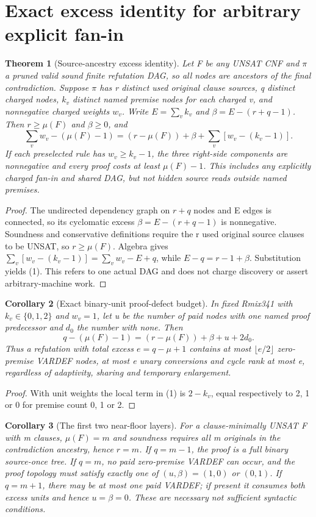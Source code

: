 \documentclass[11pt]{article}
\newtheorem{theorem}{Theorem}
\newtheorem{corollary}[theorem]{Corollary}
\begin{document}
\section*{Exact excess identity for arbitrary explicit fan-in}
\begin{theorem}[Source-ancestry excess identity]\label{thm:weighted}
Let F be any UNSAT CNF and $\pi$ a \emph{pruned} valid sound finite refutation DAG, so all nodes are ancestors of the final contradiction. Suppose $\pi$ has r distinct used original clause sources, q distinct charged nodes, $k_v$ distinct named premise nodes for each charged v, and nonnegative charged weights $w_v$. Write $E=\sum_vk_v$ and $\beta=E-(r+q-1)$. Then $r\ge\mu(F)$ and $\beta\ge0$, and
\[
\boxed{\sum_vw_v-(\mu(F)-1)
=(r-\mu(F))+\beta+\sum_v[w_v-(k_v-1)].}
\tag{1}
\]
If each preselected rule has $w_v\ge k_v-1$, the three right-side components are nonnegative and every proof costs at least $\mu(F)-1$. This includes any explicitly charged fan-in and shared DAG, but not hidden source reads outside named premises.
\end{theorem}
\begin{proof}
The undirected dependency graph on $r+q$ nodes and E edges is connected, so its cyclomatic excess $\beta=E-(r+q-1)$ is nonnegative. Soundness and conservative definitions require the r used original source clauses to be UNSAT, so $r\ge\mu(F)$. Algebra gives
$\sum_v[w_v-(k_v-1)]=\sum_vw_v-E+q$, while
$E-q=r-1+\beta$. Substitution yields (1). This refers to one actual DAG and does not charge discovery or assert arbitrary-machine work.
\end{proof}

\begin{corollary}[Exact binary-unit proof-defect budget]\label{cor:binary}
In fixed Rmix341 with $k_v\in\{0,1,2\}$ and $w_v=1$, let u be the number of paid nodes with one named proof predecessor and $d_0$ the number with none. Then
\[
\boxed{q-(\mu(F)-1)=(r-\mu(F))+\beta+u+2d_0.}
\tag{2}
\]
Thus a refutation with total excess $e=q-\mu+1$ contains at most $\lfloor e/2\rfloor$ zero-premise VARDEF nodes, at most e unary conversions and cycle rank at most e, regardless of adaptivity, sharing and temporary enlargement.
\end{corollary}
\begin{proof}
With unit weights the local term in (1) is $2-k_v$, equal respectively to 2, 1 or 0 for premise count 0, 1 or 2.
\end{proof}

\begin{corollary}[The first two near-floor layers]
For a clause-minimally UNSAT F with m clauses, $\mu(F)=m$ and soundness requires all m originals in the contradiction ancestry, hence $r=m$. If $q=m-1$, the proof is a full binary source-once tree. If $q=m$, no paid zero-premise VARDEF can occur, and the proof topology must satisfy exactly one of $(u,\beta)=(1,0)$ or $(0,1)$. If $q=m+1$, there may be at most one paid VARDEF; if present it consumes both excess units and hence $u=\beta=0$. These are necessary \emph{not sufficient} syntactic conditions.
\end{corollary}
\end{document}
